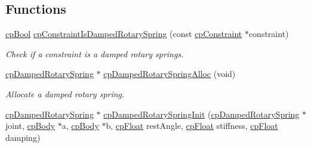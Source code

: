 \subsection*{Functions}
\begin{DoxyCompactItemize}
\item 
\hypertarget{group__cp_damped_rotary_spring_ga96352fe648c06a09924785a5f3061e32}{}\hyperlink{group__basic_types_gabc5e752c48f3449ca26ef413ecbd647e}{cp\+Bool} \hyperlink{group__cp_damped_rotary_spring_ga96352fe648c06a09924785a5f3061e32}{cp\+Constraint\+Is\+Damped\+Rotary\+Spring} (const \hyperlink{structcp_constraint}{cp\+Constraint} $\ast$constraint)\label{group__cp_damped_rotary_spring_ga96352fe648c06a09924785a5f3061e32}

\begin{DoxyCompactList}\small\item\em Check if a constraint is a damped rotary springs. \end{DoxyCompactList}\item 
\hypertarget{group__cp_damped_rotary_spring_ga391ec6d5c1f7ebdd3d6aeaab1b525ece}{}\hyperlink{structcp_damped_rotary_spring}{cp\+Damped\+Rotary\+Spring} $\ast$ \hyperlink{group__cp_damped_rotary_spring_ga391ec6d5c1f7ebdd3d6aeaab1b525ece}{cp\+Damped\+Rotary\+Spring\+Alloc} (void)\label{group__cp_damped_rotary_spring_ga391ec6d5c1f7ebdd3d6aeaab1b525ece}

\begin{DoxyCompactList}\small\item\em Allocate a damped rotary spring. \end{DoxyCompactList}\item 
\hypertarget{group__cp_damped_rotary_spring_gab1f484430f16708612d3972bea21abc0}{}\hyperlink{structcp_damped_rotary_spring}{cp\+Damped\+Rotary\+Spring} $\ast$ \hyperlink{group__cp_damped_rotary_spring_gab1f484430f16708612d3972bea21abc0}{cp\+Damped\+Rotary\+Spring\+Init} (\hyperlink{structcp_damped_rotary_spring}{cp\+Damped\+Rotary\+Spring} $\ast$joint, \hyperlink{structcp_body}{cp\+Body} $\ast$a, \hyperlink{structcp_body}{cp\+Body} $\ast$b, \hyperlink{group__basic_types_gac1ed65573e035bf892505768c852d8d3}{cp\+Float} rest\+Angle, \hyperlink{group__basic_types_gac1ed65573e035bf892505768c852d8d3}{cp\+Float} stiffness, \hyperlink{group__basic_types_gac1ed65573e035bf892505768c852d8d3}{cp\+Float} damping)\label{group__cp_damped_rotary_spring_gab1f484430f16708612d3972bea21abc0}


\end{DoxyCompactItemize}
